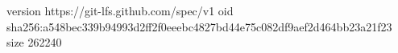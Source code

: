 version https://git-lfs.github.com/spec/v1
oid sha256:a548bec339b94993d2ff2f0eeebc4827bd44e75c082df9aef2d464bb23a21f23
size 262240
